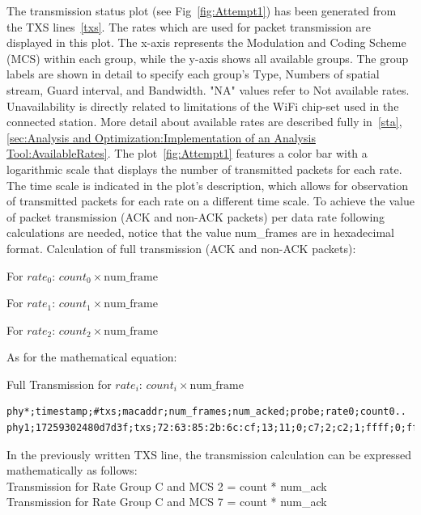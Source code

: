 The transmission status plot (see Fig~\ref{fig:Attempt1}) has been generated from the TXS lines~\ref{txs}. The rates which are used for packet transmission are displayed in this plot. The x-axis represents the Modulation and Coding Scheme (MCS) within each group, while the y-axis shows all available groups. The group labels are shown in detail to specify each group's Type, Numbers of spatial stream, Guard interval, and Bandwidth. "NA" values refer to Not available rates. Unavailability is directly related to limitations of the WiFi chip-set used in the connected station. More detail about available rates are described fully in~\ref{sta}, \ref{sec:Analysis and Optimization:Implementation of an Analysis Tool:AvailableRates}. The plot~\ref{fig:Attempt1} features a color bar with a logarithmic scale that displays the number of transmitted packets for each rate. The time scale is indicated in the plot's description, which allows for observation of transmitted packets for each rate on a different time scale. To achieve the value of packet transmission (ACK and non-ACK packets) per data rate following calculations are needed, notice that the value num\_frames are in hexadecimal format. Calculation of full transmission (ACK and non-ACK packets):
\vspace{0.25cm}

For $rate_0$: $count_0 \times \text{num\_frame}$ 

For $rate_1$: $count_1 \times \text{num\_frame}$ 

For $rate_2$: $count_2 \times \text{num\_frame}$ 
\vspace{0.25cm}

As for the mathematical equation:

Full Transmission for $rate_i$: $count_i \times \text{num\_frame}$

\vspace{0.25cm}
\begin{lstlisting}[basicstyle=\small]
phy*;timestamp;#txs;macaddr;num_frames;num_acked;probe;rate0;count0..
phy1;17259302480d7d3f;txs;72:63:85:2b:6c:cf;13;11;0;c7;2;c2;1;ffff;0;ffff;0
\end{lstlisting}
In the previously written TXS line, the transmission calculation can be expressed mathematically as follows:\\
Transmission for Rate Group C and MCS 2 = count * num\_ack \\
Transmission for Rate Group C and MCS 7 = count * num\_ack \\

